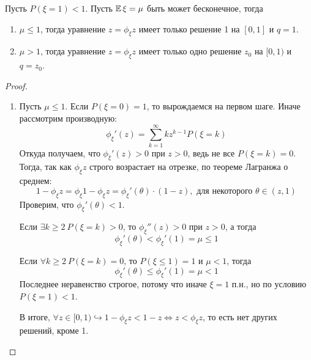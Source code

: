 \begin{theorem}  Пусть $P(\xi = 1) < 1$. Пусть $\operatorname{\mathbb{E}}\xi = \mu$ быть может бесконечное, тогда
\begin{enumerate}
    \item $\mu \leq 1$, тогда уравнение $z = \phi_{\xi}{z}$ имеет только решение 1 на $[0, 1]$ и $q = 1$.
    \item $\mu > 1$, тогда уравнение $z = \phi_{\xi}{z}$ имеет только одно решение $z_0$ на $[0, 1)$ и $q = z_0$.
\end{enumerate}
\end{theorem}

\begin{proof}
\begin{enumerate}
    \item Пусть $\mu \leq 1$. Если $P(\xi = 0) = 1$, то вырождаемся на первом шаге. Иначе рассмотрим производную:
    \begin{equation*}
        \phi_{\xi}'(z) = \sum\limits_{k = 1}^{\infty} k z^{k - 1}P(\xi = k)
    \end{equation*}
    Откуда получаем, что $\phi_{\xi}'(z) > 0$ при $z > 0$, ведь не все $P(\xi = k) = 0$.\\
    Тогда, так как $\phi_{\xi}{z}$ строго возрастает на отрезке, по теореме Лагранжа о среднем:
    \begin{equation*}
        1 - \phi_{\xi}{z} = \phi_{\xi}{1} - \phi_{\xi}{z} = \phi_{\xi}'(\theta)\cdot (1 - z), \text{ для некоторого $\theta \in (z, 1)$}
    \end{equation*}
    Проверим, что $\phi_{\xi}'(\theta) < 1$.
    
    Если $\exists k \geq 2 \ P(\xi = k) > 0$, то $\phi_{\xi}''(z) > 0$ при $z > 0$, а тогда
    \begin{equation*}
        \phi_{\xi}'(\theta) < \phi_{\xi}'(1) = \mu \leq 1
    \end{equation*}
    
    Если $\forall k \geq 2 \ P(\xi = k) = 0$, то $P(\xi \leq 1) = 1$ и $\mu < 1$, тогда
    \begin{equation*}
        \phi_{\xi}'(\theta) \leq \phi_{\xi}'(1) = \mu < 1
    \end{equation*}
    Последнее неравенство строгое, потому что иначе $\xi = 1$ п.н., но по условию $P(\xi = 1) < 1$.
    
    В итоге, $\forall z \in [0, 1) \hookrightarrow 1 - \phi_{\xi}{z} < 1 - z \Longleftrightarrow z < \phi_{\xi}{z}$, то есть нет других решений, кроме 1.
    

\end{enumerate}
\end{proof}
